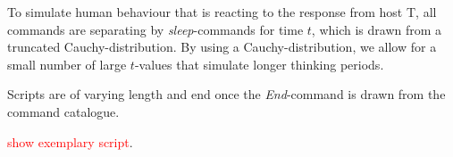 \documentclass[runningheads]{llncs}\usepackage[]{graphicx}\usepackage[]{color}
\begin{document}
To simulate human behaviour that is reacting to the response from host T, all commands are separating by \textit{sleep}-commands for time $t$, which is drawn from a truncated Cauchy-distribution. By using a Cauchy-distribution, we allow for a small number of large $t$-values that simulate longer thinking periods.  


Scripts are of varying length and end once the \textit{End}-command is drawn from the command catalogue. 

\textcolor{red}{show exemplary script}.


\end{document}
